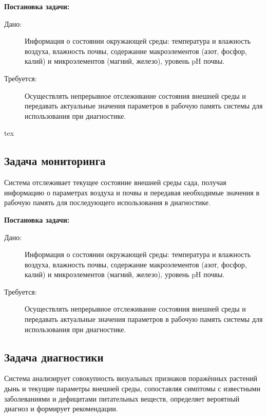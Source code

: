 \textbf{Постановка задачи:}
\begin{description}
    \item[Дано:] Информация о состоянии окружающей среды: температура и влажность воздуха, влажность почвы, содержание макроэлементов (азот, фосфор, калий) и микроэлементов (магний, железо), уровень pH почвы.
    \item[Требуется:] Осуществлять непрерывное отслеживание состояния внешней среды и передавать актуальные значения параметров в рабочую память системы для использования при диагностике.
\end{description}

tex
\subsection{Задача мониторинга}

Система отслеживает текущее состояние внешней среды сада, получая информацию о параметрах воздуха и почвы и передавая необходимые значения в рабочую память для последующего использования в диагностике.

\textbf{Постановка задачи:}
\begin{description}
    \item[Дано:] Информация о состоянии окружающей среды: температура и влажность воздуха, влажность почвы, содержание макроэлементов (азот, фосфор, калий) и микроэлементов (магний, железо), уровень pH почвы.
    \item[Требуется:] Осуществлять непрерывное отслеживание состояния внешней среды и передавать актуальные значения параметров в рабочую память системы для использования при диагностике.
\end{description}


\subsection{Задача диагностики}

Система анализирует совокупность визуальных признаков поражённых растений дынь и текущие параметры внешней среды, сопоставляя симптомы с известными заболеваниями и дефицитами питательных веществ, определяет вероятный диагноз и формирует рекомендации.

